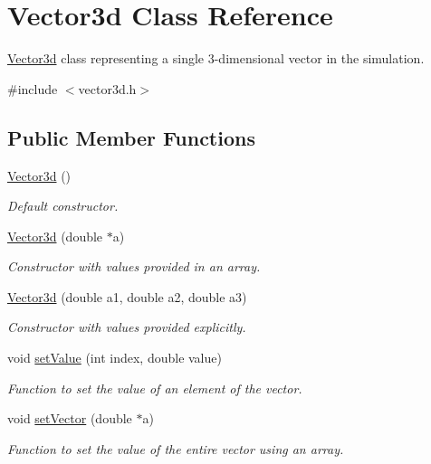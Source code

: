 \hypertarget{classVector3d}{\section{\-Vector3d \-Class \-Reference}
\label{df/dd0/classVector3d}
}


\hyperlink{classVector3d}{\-Vector3d} class representing a single 3-\/dimensional vector in the simulation.  




{\ttfamily \#include $<$vector3d.\-h$>$}

\subsection*{\-Public \-Member \-Functions}
\begin{DoxyCompactItemize}
\item 
\hyperlink{classVector3d_aac098d8695c4288e4844835e62945244}{\-Vector3d} ()
\begin{DoxyCompactList}\small\item\em \-Default constructor. \end{DoxyCompactList}\item 
\hyperlink{classVector3d_a9e5a8c606f27fe366d2075f6bc4759a6}{\-Vector3d} (double $\ast$a)
\begin{DoxyCompactList}\small\item\em \-Constructor with values provided in an array. \end{DoxyCompactList}\item 
\hyperlink{classVector3d_af61756bf2e679ccf2a5c0fd742ae3e6c}{\-Vector3d} (double a1, double a2, double a3)
\begin{DoxyCompactList}\small\item\em \-Constructor with values provided explicitly. \end{DoxyCompactList}\item 
void \hyperlink{classVector3d_ac20e0cda09c96f83cc41e23300c303ca}{set\-Value} (int index, double value)
\begin{DoxyCompactList}\small\item\em \-Function to set the value of an element of the vector. \end{DoxyCompactList}\item 
void \hyperlink{classVector3d_a82c251f7203e08ec50ea55222f40525f}{set\-Vector} (double $\ast$a)
\begin{DoxyCompactList}\small\item\em \-Function to set the value of the entire vector using an array. \end{DoxyCompactList}\item 

\end{DoxyCompactItemize}
